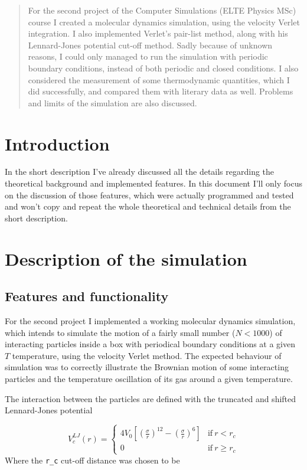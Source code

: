 \begin{abstract}
    \noindent For the second project of the Computer Simulations (ELTE Physics MSc) course I created a molecular dynamics simulation, using the velocity Verlet integration. I also implemented Verlet's pair-list method, along with his Lennard-Jones potential cut-off method. Sadly because of unknown reasons, I could only managed to run the simulation with periodic boundary conditions, instead of both periodic and closed conditions. I also considered the measurement of some thermodynamic quantities, which I did successfully, and compared them with literary data as well. Problems and limits of the simulation are also discussed.
\end{abstract}

\begin{multicols}{2}
\section{Introduction}
In the short description I've already discussed all the details regarding the theoretical background and implemented features. In this document I'll only focus on the discussion of those features, which were actually programmed and tested and won't copy and repeat the whole theoretical and technical details from the short description.

\section{Description of the simulation}
\subsection{Features and functionality}
For the second project I implemented a working molecular dynamics simulation, which intends to simulate the motion of a fairly small number ($N < 1000$) of interacting particles inside a box with periodical boundary conditions at a given $T$ temperature, using the velocity Verlet method. The expected behaviour of simulation was to correctly illustrate the Brownian motion of some interacting particles and the temperature oscillation of its gas around a given temperature. \par
The interaction between the particles are defined with the truncated and shifted Lennard-Jones potential

\begin{equation}
V_{c}^{LJ} \left( r \right)
=
\begin{cases}
4 V_{0} \left[ \left( \frac{\sigma}{r} \right)^{12} - \left( \frac{\sigma}{r} \right)^{6} \right] & \text{if}\ r < r_{c} \\
0 & \text{if}\ r \geq r_{c}
\end{cases}
\end{equation}
Where the \texttt{r\_c} cut-off distance was chosen to be
 

\end{multicols}
